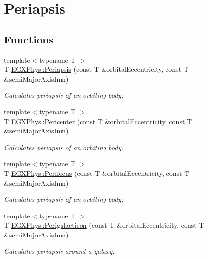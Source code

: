 \hypertarget{group___e_g_x_phys-_periapsis}{}\section{Periapsis}
\label{group___e_g_x_phys-_periapsis}
\subsection*{Functions}
\begin{DoxyCompactItemize}
\item 
{\footnotesize template$<$typename T $>$ }\\T \mbox{\hyperlink{group___e_g_x_phys-_periapsis_gad487212733711bc2ce73c8137c9309c3}{E\+G\+X\+Phys\+::\+Periapsis}} (const T \&orbital\+Eccentricity, const T \&semi\+Major\+Axis\+Inm)
\begin{DoxyCompactList}\small\item\em Calculates periapsis of an orbiting body. \end{DoxyCompactList}\item 
{\footnotesize template$<$typename T $>$ }\\T \mbox{\hyperlink{group___e_g_x_phys-_periapsis_gaa769950fdad108083236bb0efded1196}{E\+G\+X\+Phys\+::\+Pericenter}} (const T \&orbital\+Eccentricity, const T \&semi\+Major\+Axis\+Inm)
\begin{DoxyCompactList}\small\item\em Calculates periapsis of an orbiting body. \end{DoxyCompactList}\item 
{\footnotesize template$<$typename T $>$ }\\T \mbox{\hyperlink{group___e_g_x_phys-_periapsis_ga569c67766dd7b590c630caa6582ad000}{E\+G\+X\+Phys\+::\+Perifocus}} (const T \&orbital\+Eccentricity, const T \&semi\+Major\+Axis\+Inm)
\begin{DoxyCompactList}\small\item\em Calculates periapsis of an orbiting body. \end{DoxyCompactList}\item 
{\footnotesize template$<$typename T $>$ }\\T \mbox{\hyperlink{group___e_g_x_phys-_periapsis_ga05df9ab5aa8e1efa938f740b894ade25}{E\+G\+X\+Phys\+::\+Perigalacticon}} (const T \&orbital\+Eccentricity, const T \&semi\+Major\+Axis\+Inm)
\begin{DoxyCompactList}\small\item\em Calculates periapsis around a galaxy. \end{DoxyCompactList}\item 

\end{DoxyCompactItemize}
